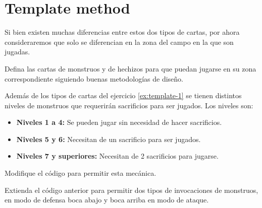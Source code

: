 \section{Template method}
  \begin{Exercise}[title={Zonas de juego}, label={ex:template-1}]
    Si bien existen muchas diferencias entre estos dos tipos de cartas, por ahora 
    consideraremos que solo se diferencian en la zona del campo en la que son jugadas.

    Defina las cartas de monstruos y de hechizos para que puedan jugarse en su zona 
    correspondiente siguiendo buenas metodologías de diseño.
  \end{Exercise}

  \begin{Exercise}[title={Niveles de monstruos}, label={ex:template-2}]
    Además de los tipos de cartas del ejercicio \ref{ex:template-1} se tienen distintos 
    niveles de monstruos que requerirán sacrificios para ser jugados.
    Los niveles son:
    \begin{itemize}
      \item \textbf{Niveles 1 a 4:} Se pueden jugar sin necesidad de hacer sacrificios.
      \item \textbf{Niveles 5 y 6:} Necesitan de un sacrificio para ser jugados.
      \item \textbf{Niveles 7 y superiores:} Necesitan de 2 sacrificios para jugarse.  
    \end{itemize}

    Modifique el código para permitir esta mecánica.
  \end{Exercise}

  \begin{Exercise}[title={Invocaciones de monstruos (Propuesto)}, label={ex:template-3}]
    Extienda el código anterior para permitir dos tipos de invocaciones de monstruos, en
    modo de defensa boca abajo y boca arriba en modo de ataque.
  \end{Exercise}
% 